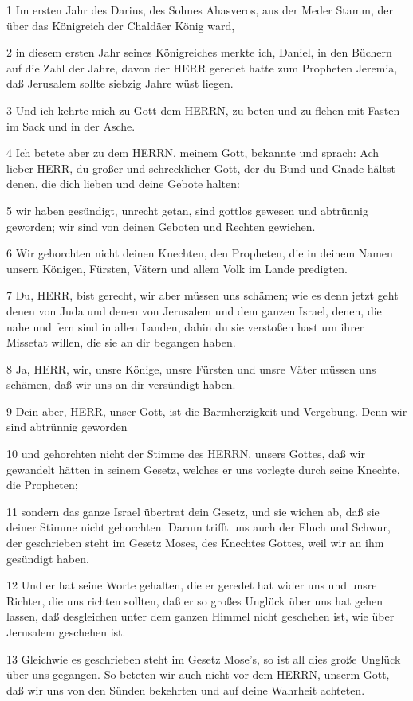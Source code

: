 \par 1 Im ersten Jahr des Darius, des Sohnes Ahasveros, aus der Meder Stamm, der über das Königreich der Chaldäer König ward,
\par 2 in diesem ersten Jahr seines Königreiches merkte ich, Daniel, in den Büchern auf die Zahl der Jahre, davon der HERR geredet hatte zum Propheten Jeremia, daß Jerusalem sollte siebzig Jahre wüst liegen.
\par 3 Und ich kehrte mich zu Gott dem HERRN, zu beten und zu flehen mit Fasten im Sack und in der Asche.
\par 4 Ich betete aber zu dem HERRN, meinem Gott, bekannte und sprach: Ach lieber HERR, du großer und schrecklicher Gott, der du Bund und Gnade hältst denen, die dich lieben und deine Gebote halten:
\par 5 wir haben gesündigt, unrecht getan, sind gottlos gewesen und abtrünnig geworden; wir sind von deinen Geboten und Rechten gewichen.
\par 6 Wir gehorchten nicht deinen Knechten, den Propheten, die in deinem Namen unsern Königen, Fürsten, Vätern und allem Volk im Lande predigten.
\par 7 Du, HERR, bist gerecht, wir aber müssen uns schämen; wie es denn jetzt geht denen von Juda und denen von Jerusalem und dem ganzen Israel, denen, die nahe und fern sind in allen Landen, dahin du sie verstoßen hast um ihrer Missetat willen, die sie an dir begangen haben.
\par 8 Ja, HERR, wir, unsre Könige, unsre Fürsten und unsre Väter müssen uns schämen, daß wir uns an dir versündigt haben.
\par 9 Dein aber, HERR, unser Gott, ist die Barmherzigkeit und Vergebung. Denn wir sind abtrünnig geworden
\par 10 und gehorchten nicht der Stimme des HERRN, unsers Gottes, daß wir gewandelt hätten in seinem Gesetz, welches er uns vorlegte durch seine Knechte, die Propheten;
\par 11 sondern das ganze Israel übertrat dein Gesetz, und sie wichen ab, daß sie deiner Stimme nicht gehorchten. Darum trifft uns auch der Fluch und Schwur, der geschrieben steht im Gesetz Moses, des Knechtes Gottes, weil wir an ihm gesündigt haben.
\par 12 Und er hat seine Worte gehalten, die er geredet hat wider uns und unsre Richter, die uns richten sollten, daß er so großes Unglück über uns hat gehen lassen, daß desgleichen unter dem ganzen Himmel nicht geschehen ist, wie über Jerusalem geschehen ist.
\par 13 Gleichwie es geschrieben steht im Gesetz Mose's, so ist all dies große Unglück über uns gegangen. So beteten wir auch nicht vor dem HERRN, unserm Gott, daß wir uns von den Sünden bekehrten und auf deine Wahrheit achteten.
